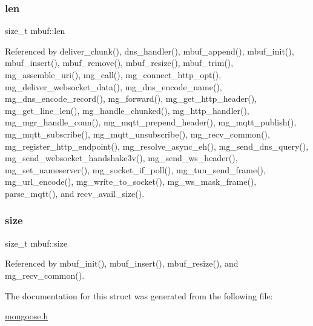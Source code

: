 \mbox{\label{structmbuf_a4da00860609dd46fe8b679d5e1deeac3_a4da00860609dd46fe8b679d5e1deeac3}} 
\subsubsection{\texorpdfstring{len}{len}}
{\footnotesize\ttfamily size\+\_\+t mbuf\+::len}



Referenced by deliver\+\_\+chunk(), dns\+\_\+handler(), mbuf\+\_\+append(), mbuf\+\_\+init(), mbuf\+\_\+insert(), mbuf\+\_\+remove(), mbuf\+\_\+resize(), mbuf\+\_\+trim(), mg\+\_\+assemble\+\_\+uri(), mg\+\_\+call(), mg\+\_\+connect\+\_\+http\+\_\+opt(), mg\+\_\+deliver\+\_\+websocket\+\_\+data(), mg\+\_\+dns\+\_\+encode\+\_\+name(), mg\+\_\+dns\+\_\+encode\+\_\+record(), mg\+\_\+forward(), mg\+\_\+get\+\_\+http\+\_\+header(), mg\+\_\+get\+\_\+line\+\_\+len(), mg\+\_\+handle\+\_\+chunked(), mg\+\_\+http\+\_\+handler(), mg\+\_\+mgr\+\_\+handle\+\_\+conn(), mg\+\_\+mqtt\+\_\+prepend\+\_\+header(), mg\+\_\+mqtt\+\_\+publish(), mg\+\_\+mqtt\+\_\+subscribe(), mg\+\_\+mqtt\+\_\+unsubscribe(), mg\+\_\+recv\+\_\+common(), mg\+\_\+register\+\_\+http\+\_\+endpoint(), mg\+\_\+resolve\+\_\+async\+\_\+eh(), mg\+\_\+send\+\_\+dns\+\_\+query(), mg\+\_\+send\+\_\+websocket\+\_\+handshake3v(), mg\+\_\+send\+\_\+ws\+\_\+header(), mg\+\_\+set\+\_\+nameserver(), mg\+\_\+socket\+\_\+if\+\_\+poll(), mg\+\_\+tun\+\_\+send\+\_\+frame(), mg\+\_\+url\+\_\+encode(), mg\+\_\+write\+\_\+to\+\_\+socket(), mg\+\_\+ws\+\_\+mask\+\_\+frame(), parse\+\_\+mqtt(), and recv\+\_\+avail\+\_\+size().

\mbox{\label{structmbuf_ae245d03a50c2891c1fb228093d842270_ae245d03a50c2891c1fb228093d842270}} 
\subsubsection{\texorpdfstring{size}{size}}
{\footnotesize\ttfamily size\+\_\+t mbuf\+::size}



Referenced by mbuf\+\_\+init(), mbuf\+\_\+insert(), mbuf\+\_\+resize(), and mg\+\_\+recv\+\_\+common().



The documentation for this struct was generated from the following file\+:\begin{DoxyCompactItemize}
\item 
\hyperlink{mongoose_8h}{mongoose.\+h}\end{DoxyCompactItemize}

